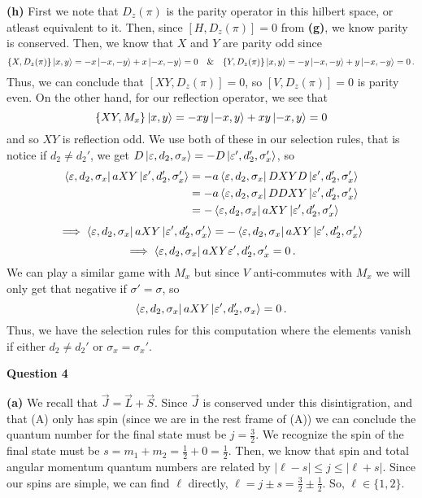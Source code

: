 \documentclass[10pt]{article}
\begin{document}
\textbf{(h)} First we note that $D_{z}(\pi)$ is the parity operator in this hilbert space, or atleast equivalent to it. Then, since $[H,D_{z}(\pi)] = 0$ from \textbf{(g)}, we know parity is conserved. Then, we know that $X$ and $Y$ are parity odd since
\[ \{X,D_{z}(\pi)\}\ket{x,y} = -x\ket{-x,-y} + x\ket{-x,-y} = 0 \quad \& \quad \{Y,D_{z}(\pi)\}\ket{x,y} = -y\ket{-x,-y} + y\ket{-x,-y} = 0\, .\]
Thus, we can conclude that $[XY,D_{z}(\pi)] = 0$, so $[V,D_{z}(\pi)] = 0$ is parity even. On the other hand, for our reflection operator, we see that
\[ \{XY,M_{x}\}\ket{x,y} = -xy\ket{-x,y} + xy\ket{-x,y} =  0 \]
and so $XY$ is reflection odd. We use both of these in our selection rules, that is notice if $d_{2} \neq d_{2}'$, we get $D\ket{\varepsilon,d_{2},\sigma_{x}} = - D\ket{\varepsilon',d_{2}',\sigma_{x}'}$, so
\begin{equation*}
  \begin{split}
    \bra{\varepsilon,d_{2},\sigma_{x}}aXY\ket{\varepsilon',d_{2}',\sigma_{x}'} & = -a\bra{\varepsilon,d_{2},\sigma_{x}}DXYD\ket{\varepsilon',d_{2}',\sigma_{x}'} \\
    & = -a\bra{\varepsilon,d_{2},\sigma_{x}}DDXY\ket{\varepsilon',d_{2}',\sigma_{x}'} \\
    & = -\bra{\varepsilon,d_{2},\sigma_{x}}aXY\ket{\varepsilon',d_{2}',\sigma_{x}'} \\
  \end{split}
\end{equation*}
\[ \implies \bra{\varepsilon,d_{2},\sigma_{x}}aXY\ket{\varepsilon',d_{2}',\sigma_{x}'} = -\bra{\varepsilon,d_{2},\sigma_{x}}aXY\ket{\varepsilon',d_{2}',\sigma_{x}'}\]
\[ \implies \bra{\varepsilon,d_{2},\sigma_{x}}aXY{\varepsilon',d_{2}',\sigma_{x}'} = 0\, .\]
We can play a similar game with $M_{x}$ but since $V$ anti-commutes with $M_{x}$ we will only get that negative if $\sigma' = \sigma$, so
\[ \bra{\varepsilon,d_{2},\sigma_{x}}aXY\ket{\varepsilon',d_{2}',\sigma_{x}} = 0 \, .\]
Thus, we have the selection rules for this computation where the elements vanish if either $d_{2} \neq d_{2}'$ or $\sigma_{x} = \sigma_{x}'$.

\textbf{Question 4}

\textbf{(a)} We recall that $\vec{J} = \vec{L} + \vec{S}$. Since $\vec{J}$ is conserved under this disintigration, and that (A) only has spin (since we are in the rest frame of (A)) we can conclude the quantum number for the final state must be $j = \frac{3}{2}$. We recognize the spin of the final state must be $s = m_{1} + m_{2} = \frac{1}{2} + 0 = \frac{1}{2}$. Then, we know that spin and total angular momentum quantum numbers are related by $|\ell - s| \leq j \leq |\ell + s|$. Since our spins are simple, we can find $\ell$ directly, $\ell = j \pm s = \frac{3}{2} \pm \frac{1}{2}$. So, $\ell\in \{1, 2\}$.
\end{document}
